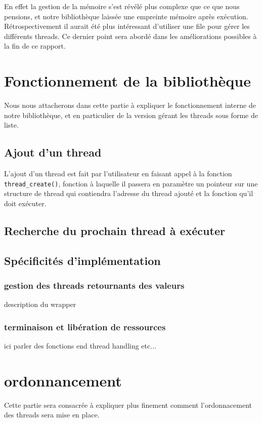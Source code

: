 \documentclass{article}
\begin{document}
			En effet la gestion de la mémoire s'est révélé plus
            complexe que ce que nous pensions, et notre bibliothèque
            laissée une empreinte mémoire après exécution.
            Rétrospectivement il aurait été plus intéressant
            d'utiliser une file pour gérer les différents threads. Ce
            dernier point sera abordé dans les améliorations possibles
            à la fin de ce rapport.
			

	\section{Fonctionnement de la bibliothèque}
	Nous nous attacherons dans cette partie à expliquer le
    fonctionnement interne de notre bibliothèque, et en particulier
     de la version gérant les threads sous forme de
    liste.

		\subsection{Ajout d'un thread}
		L'ajout d'un thread est fait par l'utilisateur en faisant 
		appel à la fonction \verb!thread_create()!, fonction à laquelle il
		passera en paramètre un pointeur sur une structure de thread qui 
		contiendra l'adresse du thread ajouté et la fonction qu'il doit
		exécuter.
		

		\subsection{Recherche du prochain thread à exécuter}

		\subsection{Spécificités d'implémentation}
		
			\subsubsection{gestion des threads retournants des valeurs}
			description du wrapper
			
			\subsubsection{terminaison et libération de ressources}
			ici parler des fonctions end thread handling etc...
		

	\section{ordonnancement}
	Cette partie sera consacrée à expliquer plus finement comment
    l'ordonnacement des threads sera mise en place.
\end{document}
